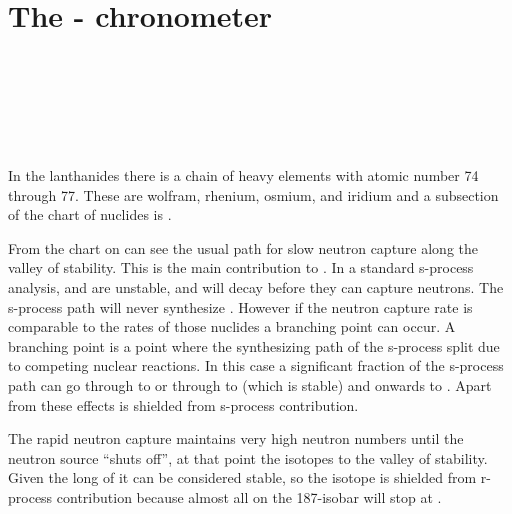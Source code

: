 \section{The - chronometer}

 \\
 \\
 \\
 \\
 \\

\iffalse
{}

In the lanthanides there is a chain of heavy elements with atomic number 74 through 77.
These are wolfram, rhenium, osmium, and iridium and a subsection of the chart of nuclides is .



From the chart on can see the usual path for slow neutron capture along the valley of stability.
This is the main contribution to . In a standard s-process analysis,  and  are unstable, and will decay before they can capture neutrons. The s-process path will never synthesize . However if the neutron capture rate is comparable to the \betadecay rates of those nuclides a branching point can occur. A branching point is a point where the synthesizing path of the s-process split due to competing nuclear reactions. In this case a significant fraction of the s-process path can go through  to  or through  to  (which is stable) and onwards to . Apart from these effects  is shielded from s-process contribution.

The rapid neutron capture maintains very high neutron numbers until the neutron source ``shuts off'', at that point the isotopes \betadecay to the valley of stability. Given the long \halflife of  it can be considered stable, so the  isotope is shielded from r-process contribution because almost all \betadecay on the 187-isobar will stop at .

